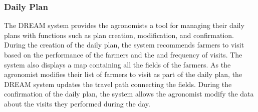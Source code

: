 \begin{flushleft}
\subsubsection{Daily Plan}
The DREAM system provides the agronomists a tool for managing their daily plans with functions such as plan creation, modification, and confirmation. During the creation of the daily plan, the system recommends farmers to visit based on the performance of the farmers and the and frequency of visits. The system also displays a map containing all the fields of the farmers. As the agronomist modifies their list of farmers to visit as part of the daily plan, the DREAM system updates the travel path connecting the fields. During the confirmation of the daily plan, the system allows the agronomist modify the data about the visits they performed during the day.
\end{flushleft}




